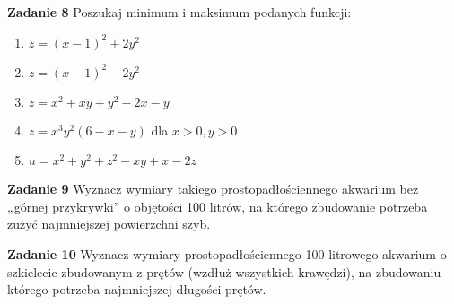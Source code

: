 \documentclass[a4paper,11pt]{article}
\begin{document}
\bigskip

\textbf{Zadanie 8} Poszukaj minimum i maksimum podanych funkcji:

\begin{enumerate}
    \item $z = (x-1)^2 + 2y^2$
    \item $z = (x-1)^2 - 2y^2 $
    \item $z = x^2 + xy + y^2 - 2x - y $
    \item $z = x^3y^2 (6-x-y) $ dla $x>0,y>0$
    \item $u = x^2 + y^2 + z^2 -xy + x - 2z$
\end{enumerate}

\bigskip

\textbf{Zadanie 9} Wyznacz wymiary takiego prostopadłościennego akwarium
bez „górnej przykrywki” o objętości 100 litrów, na którego zbudowanie
potrzeba zużyć najmniejszej powierzchni szyb.

\bigskip

\textbf{Zadanie 10} Wyznacz wymiary prostopadłościennego 100 litrowego
akwarium o szkielecie zbudowanym z prętów (wzdłuż wszystkich krawędzi),
na zbudowaniu którego potrzeba najmniejszej długości prętów.
\end{document}

